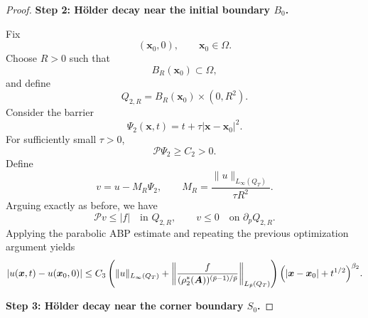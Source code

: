 \documentclass[final,onefignum,onetabnum]{mousaviart}
\begin{document}
\begin{proof}
		\medskip
		
		\noindent
		{\bf Step 2: Hölder decay near the initial boundary \(B_0\).}
		
		Fix
		\[
		(\boldsymbol{x}_0,0),
		\qquad
		\boldsymbol{x}_0\in\Omega.
		\]
		Choose \(R>0\) such that
		\[
		B_R(\boldsymbol{x}_0)\subset\Omega,
		\]
		and define
		\[
		Q_{2,R}
		=
		B_R(\boldsymbol{x}_0)\times(0,R^2).
		\]
		Consider the barrier
		\[
		\Psi_2(\boldsymbol{x},t)
		=
		t + \tau |\boldsymbol{x}-\boldsymbol{x}_0|^2.
		\]
		For sufficiently small \(\tau>0\),
		\[
		\mathcal{P} \Psi_2\ge C_2>0.
		\]
		Define
		\[
		v=u-M_R\Psi_2,
		\qquad
		M_R
		=
		\frac{\|u\|_{L_\infty(Q_T)}}{\tau R^2}.
		\]
		Arguing exactly as before, we have
		\[
		\mathcal{P} v\le |f|
		\quad \text{in } Q_{2,R},
		\qquad
		v\le0
		\quad \text{on } \partial_p Q_{2,R}.
		\]
		Applying the parabolic ABP estimate and repeating the previous optimization argument yields
		\begin{equation}
			\label{ineq:initial-holder}
			|u(\boldsymbol{x},t)-u(\boldsymbol{x}_0,0)|
			\le
			C_3
			\left(
			\|u\|_{L_\infty(Q_T)}
			+
			\left\|
			\frac{f}{(\rho_2^\ast(\boldsymbol{A}))^{(\bar p-1)/\bar p}}
			\right\|_{L_{\bar p}(Q_T)}
			\right)
			\Bigl(
			|\boldsymbol{x}-\boldsymbol{x}_0|
			+
			t^{1/2}
			\Bigr)^{\beta_2}.
		\end{equation}
		
		\medskip
		
		\noindent
		{\bf Step 3: Hölder decay near the corner boundary \(S_0\).}
		

\end{proof}
\end{document}
